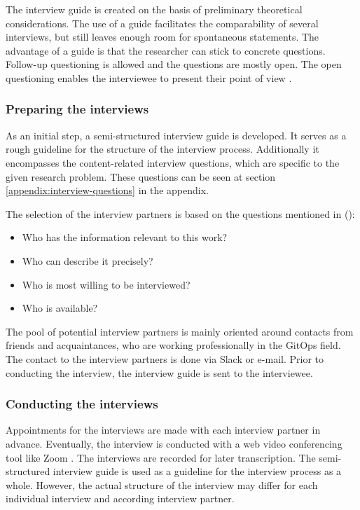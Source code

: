The interview guide is created on the basis of preliminary theoretical considerations.
The use of a guide facilitates the comparability of several interviews,
but still leaves enough room for spontaneous statements.
The advantage of a guide is that the researcher can stick to concrete questions.
Follow-up questioning is allowed and the questions are mostly open.
The open questioning enables the interviewee to present their point of view
\autocite{berger2016wissenschaftliches}.


\subsubsection{Preparing the interviews}

As an initial step,
a semi-structured interview guide is developed.
It serves as a rough guideline for the structure of the interview process.
Additionally it encompasses the content-related interview questions,
which are specific to the given research problem.
These questions can be seen at section \ref{appendix:interview-questions} in the appendix.

The selection of the interview partners is based on the questions mentioned in
\citeauthor{glaser2010experteninterviews} (\citeyear{glaser2010experteninterviews}):

\begin{itemize}
	\item Who has the information relevant to this work?
	\item Who can describe it precisely?
	\item Who is most willing to be interviewed?
	\item Who is available?
\end{itemize}

The pool of potential interview partners is mainly oriented around
contacts from friends and acquaintances,
who are working professionally in the GitOps field.
The contact to the interview partners is done via Slack \autocite{slackWebsite} or e-mail.
Prior to conducting the interview, the interview guide is sent to the interviewee.

\subsubsection{Conducting the interviews}

Appointments for the interviews are made with each interview partner in advance. 
Eventually, the interview is conducted with a web video conferencing tool like Zoom \autocite{zoomWebsite}.
The interviews are recorded for later transcription.
The semi-structured interview guide
is used as a guideline for the interview process as a whole.
However, the actual structure of the interview may differ for each individual interview and according interview partner.

